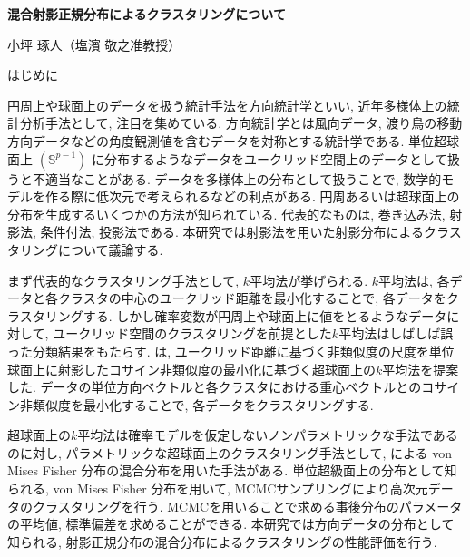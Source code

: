 \documentclass[a4j,11pt]{jarticle}
\makeatletter
\def\section{\@startsection{section}{1}{\z@}
   {0.8\Cvs \@plus.5\Cdp \@minus.2\Cdp}
   {0.2\Cvs \@plus.3\Cdp}
   {\normalfont \Large \bfseries}}
\makeatother
\begin{document}


\begin{center}
{\Large \textbf{混合射影正規分布によるクラスタリングについて}}
\end{center}
\begin{flushright}
小坪 琢人（塩濱 敬之准教授）
\end{flushright}
\vspace{-3zh}


\section{はじめに}

円周上や球面上のデータを扱う統計手法を方向統計学といい, 近年多様体上の統計分析手法として, 注目を集めている. 方向統計学とは風向データ, 渡り鳥の移動方向データなどの角度観測値を含むデータを対称とする統計学である. 単位超球面上 $(\mathbb{S}^{p-1})$ に分布するようなデータをユークリッド空間上のデータとして扱うと不適当なことがある. データを多様体上の分布として扱うことで, 数学的モデルを作る際に低次元で考えられるなどの利点がある. 円周あるいは超球面上の分布を生成するいくつかの方法が知られている. 代表的なものは, 巻き込み法, 射影法, 条件付法, 投影法である. 本研究では射影法を用いた射影分布によるクラスタリングについて議論する.

まず代表的なクラスタリング手法として, $k$平均法が挙げられる. $k$平均法は, 各データと各クラスタの中心のユークリッド距離を最小化することで, 各データをクラスタリングする. しかし確率変数が円周上や球面上に値をとるようなデータに対して, ユークリッド空間のクラスタリングを前提とした$k$平均法はしばしば誤った分類結果をもたらす. \citet{SKMcluster}は, ユークリッド距離に基づく非類似度の尺度を単位球面上に射影したコサイン非類似度の最小化に基づく超球面上の$k$平均法を提案した. データの単位方向ベクトルと各クラスタにおける重心ベクトルとのコサイン非類似度を最小化することで, 各データをクラスタリングする. 

超球面上の$k$平均法は確率モデルを仮定しないノンパラメトリックな手法であるのに対し,  パラメトリックな超球面上のクラスタリング手法として, \citet{Gopal}による von Mises Fisher 分布の混合分布を用いた手法がある. 単位超級面上の分布として知られる, von Mises Fisher 分布を用いて, MCMCサンプリングにより高次元データのクラスタリングを行う. MCMCを用いることで求める事後分布のパラメータの平均値, 標準偏差を求めることができる. 本研究では方向データの分布として知られる, 射影正規分布の混合分布によるクラスタリングの性能評価を行う. 
\end{document}
